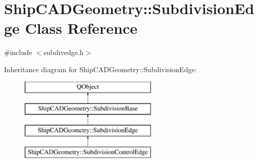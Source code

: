 \hypertarget{classShipCADGeometry_1_1SubdivisionEdge}{\section{Ship\-C\-A\-D\-Geometry\-:\-:Subdivision\-Edge Class Reference}
\label{classShipCADGeometry_1_1SubdivisionEdge}
}


{\ttfamily \#include $<$subdivedge.\-h$>$}

Inheritance diagram for Ship\-C\-A\-D\-Geometry\-:\-:Subdivision\-Edge\-:\begin{figure}[H]
\begin{center}
\leavevmode
\includegraphics[height=4.000000cm]{classShipCADGeometry_1_1SubdivisionEdge}
\end{center}
\end{figure}
